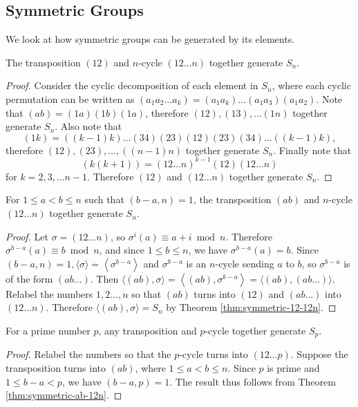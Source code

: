 \subsection{Symmetric Groups}
We look at how symmetric groups can be generated by its elements. 

\begin{theorem} \label{thm:symmetric-12-12n}
	The transposition $(12)$ and $n$-cycle $(12 \dots n)$ together generate $S_n$. 
\end{theorem}
\begin{proof}
	Consider the cyclic decomposition of each element in $S_n$, where each cyclic permutation can be written as 
	$
	(a_1a_2\dots a_k) = (a_1 a_k) \dots (a_1 a_3) (a_1 a_2). 
	$
	Note that $(ab) = (1a)(1b)(1a)$, therefore $(12), (13), \ldots (1n)$ together generate $S_n$. Also note that  
	$$(1k)=((k-1)k)\dots(34)(23)(12)(23)(34)\dots((k-1)k),$$
	therefore $(12), (23), \dots, ((n-1)n)$ together generate $S_n$. Finally note that 
	$$
	(k(k+1)) = (12\dots n)^{k-1} (12) (12\dots n)
	$$
	for $k = 2, 3, \dots n - 1$. Therefore $(12)$ and $(12 \dots n)$ together generate $S_n$. 
\end{proof}

\begin{theorem} \label{thm:symmetric-ab-12n}
	For $1 \le a < b \le n$ such that $(b - a, n) = 1$, the transposition $(ab)$ and $n$-cycle $(12 \dots n)$ together generate $S_n$.
\end{theorem}
\begin{proof}
	Let $\sigma=(12 \ldots n)$, so $\sigma^i(a) \equiv a+i \bmod n$. Therefore $\sigma^{b-a}(a) \equiv b \bmod n$, and since $1 \le b \le n$, we have $\sigma^{b-a}(a)=b$. Since $(b-a, n)=1,\langle\sigma\rangle=\left\langle\sigma^{b-a}\right\rangle$ and $\sigma^{b-a}$ is an $n$-cycle sending $a$ to $b$, so $\sigma^{b-a}$ is of the form $(a b \ldots)$. Then
	$
	\langle(a b), \sigma\rangle=\left\langle(a b), \sigma^{b-a}\right\rangle=\langle(a b),(a b \ldots)\rangle .
	$
	Relabel the numbers $1,2 \ldots, n$ so that $(a b)$ turns into $(12)$ and $(a b \ldots)$ into $(12 \ldots n)$. Therefore $\langle(a b), \sigma\rangle=S_n$ by Theorem \ref{thm:symmetric-12-12n}.
\end{proof}

\begin{theorem} \label{thm:symmetric-prime}
	For a prime number $p$, any transposition and $p$-cycle together generate $S_p$.
\end{theorem}
\begin{proof}
	Relabel the numbers so that the $p$-cycle turns into $(12 \dots p)$. Suppose the transposition turns into $(ab)$, where $1 \le a < b \le n$. Since $p$ is prime and $1 \le b - a < p$, we have $(b - a, p) = 1$. The result thus follows from Theorem \ref{thm:symmetric-ab-12n}.
\end{proof}

